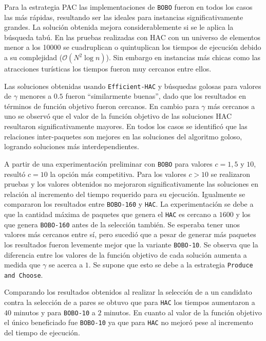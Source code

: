 Para la estrategia PAC las implementaciones de \texttt{BOBO} fueron en todos los casos las más rápidas, resultando ser las ideales para instancias significativamente grandes. La solución obtenida mejora considerablemente si se le aplica la búsqueda tabú. En las pruebas realizadas con HAC con un universo de elementos menor a los 10000 se cuadruplican o quintuplican los tiempos de ejecución debido a su complejidad ($\mathcal{O}(N^{2}\log n)$). Sin embargo en instancias más chicas como las atracciones turísticas los tiempos fueron muy cercanos entre ellos.

Las soluciones obtenidas usando \texttt{Efficient-HAC} y búsquedas golosas para valores de $\gamma$ menores a $0.5$ fueron \textquotedblleft similarmente buenas\textquotedblright , dado que los resultados en términos de función objetivo fueron cercanos. En cambio para $\gamma$ más cercanos a uno se observó que el valor de la función objetivo de las soluciones HAC resultaron significativamente mayores. En todos los casos se identificó que las relaciones inter-paquetes son mejores en las soluciones del algoritmo goloso, logrando soluciones más interdependientes.

A partir de una experimentación preliminar con \texttt{BOBO} para valores $c=1, 5$ y $10$, resultó $c=10$ la opción más competitiva. Para los valores $c>10$ se realizaron pruebas y los valores obtenidos no mejoraron significativamente las soluciones en relación al incremento del tiempo requerido para su ejecución. Igualmente se compararon los resultados entre \texttt{BOBO-160} y \texttt{HAC}. La experimentación se debe a que la cantidad máxima de paquetes que genera el \texttt{HAC} es cercano a $1600$ y los que genera \texttt{BOBO-160} antes de la selección también. Se esperaba tener unos valores más cercanos entre sí, pero sucedió que a pesar de generar más paquetes los resultados fueron levemente mejor que la variante \texttt{BOBO-10}. Se  observa que la diferencia entre los valores de la función objetivo de cada solución aumenta a medida que $\gamma$ se acerca a $1$. Se supone que esto se debe a la estrategia \texttt{Produce and Choose}.

Comparando los resultados obtenidos al realizar la selección de a un candidato contra la selección de a pares se obtuvo que para \texttt{HAC} los tiempos aumentaron a $40$ minutos y para \texttt{BOBO-10} a $2$ minutos. En cuanto al valor de la función objetivo el único beneficiado fue \texttt{BOBO-10} ya que para \texttt{HAC} no mejoró pese al incremento del tiempo de ejecución.